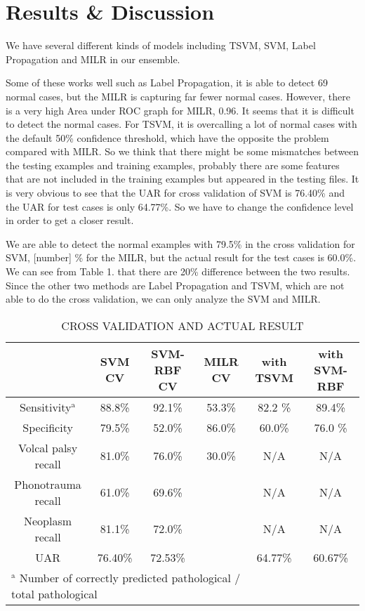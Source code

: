 \section{Results \& Discussion}


We have several different kinds of models including TSVM, SVM, Label Propagation and MILR in our ensemble. 

Some of these works well such as Label Propagation, it is able to detect 69 normal cases, but the MILR is capturing far fewer normal cases. However, there is a very high Area under ROC graph for MILR, 0.96. It seems that it is difficult to detect the normal cases. For TSVM, it is overcalling a lot of normal cases with the default 50\% confidence threshold, which have the opposite the problem compared with MILR. So we think that there might be some mismatches between the testing examples and training examples, probably there are some features that are not included in the training examples but appeared in the testing files. It is very obvious to see that the UAR for cross validation of SVM is 76.40\% and the UAR for test cases is only 64.77\%. So we have to change the confidence level in order to get a closer result.

We are able to detect the normal examples with 79.5\% in the cross validation for SVM, [number] \% for the MILR, but the actual result for the test cases is 60.0\%. We can see from Table 1. that there are 20\% difference between the two results. Since the other two methods are Label Propagation and TSVM, which are not able to do the cross validation, we can only analyze the SVM and MILR.


\begin{table*}[!htbp]
	\caption{CROSS VALIDATION AND ACTUAL RESULT}
	\begin{center}
		\begin{tabular}{|c|c|c|c|c|c|}
			\hline
			 & SVM CV & SVM-RBF CV & MILR CV & with TSVM & with SVM-RBF \\
			\hline
			Sensitivity$^{\mathrm{a}}$  & 88.8\%& 92.1\% & 53.3\% & 82.2 \% & 89.4\% \\
			\hline
			Specificity & 79.5\% & 52.0\%& 86.0\%& 60.0\% & 76.0 \% \\
			\hline
			Volcal palsy recall & 81.0\% &76.0\%& 30.0\% & N/A & N/A \\
			\hline
			Phonotrauma recall & 61.0\% &69.6\%&& N/A& N/A\\
			\hline
			Neoplasm recall & 81.1\% & 72.0\%&& N/A& N/A \\
			\hline
			UAR & 76.40\% &72.53\% & & 64.77\% & 60.67\%\\
			\hline
			\multicolumn{4}{l}{$^{\mathrm{a}}$ Number of correctly predicted pathological / total pathological}
		\end{tabular}
		\label{tab2}
	\end{center}
\end{table*}


